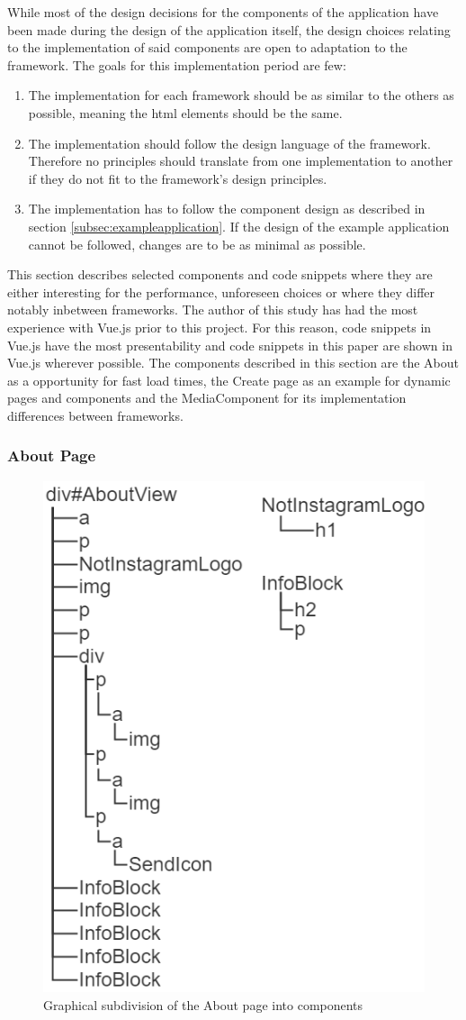 \documentclass[a4paper, 12pt]{article}
\begin{document}
While most of the design decisions for the components of the application have been made during the design of the application itself, the design choices relating to the implementation of said components are open to adaptation to the framework.
The goals for this implementation period are few:

\begin{enumerate}
  \item The implementation for each framework should be as similar to the others as possible, meaning the \acrshort{html} elements should be the same.
  \item The implementation should follow the design language of the framework.
  Therefore no principles should translate from one implementation to another if they do not fit to the framework's design principles.
  \item The implementation has to follow the component design as described in section \ref{subsec:exampleapplication}.
  If the design of the example application cannot be followed, changes are to be as minimal as possible.
\end{enumerate}

This section describes selected components and code snippets where they are either interesting for the performance, unforeseen choices or where they differ notably inbetween frameworks.
The author of this study has had the most experience with Vue.js prior to this project.
For this reason, code snippets in Vue.js have the most presentability and code snippets in this paper are shown in Vue.js wherever possible.
The components described in this section are the About as a opportunity for fast load times, the Create page as an example for dynamic pages and components and the MediaComponent for its implementation differences between frameworks.

\subsubsection{About Page}

\begin{figure}[h!]
  \begin{center}
  \includegraphics[width=0.4\linewidth, keepaspectratio]{diagrams/about-dom-2.png}
  \end{center}
  \caption{Graphical subdivision of the About page into components}\label{fig:graphicalAboutPage}
\end{figure}
\end{document}
